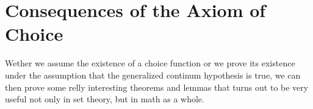 \section{Consequences of the Axiom of Choice}
Wether we assume the existence of a choice function or we prove its existence under the assumption 
that the generalized continum hypothesis is true, we can then prove some relly interesting theorems and 
lemmas that turns out to be very useful not only in set theory, but in math as a whole.



